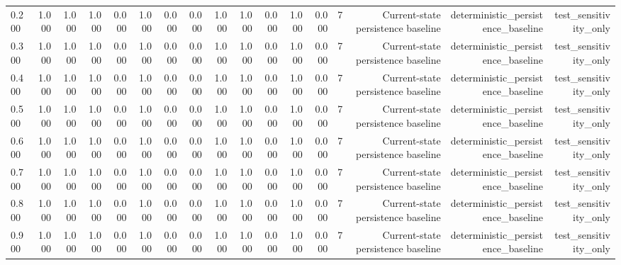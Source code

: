 \begin{tabular}{lrrrrrrrrrrrrrrrr}
0.200 & 1.000 & 1.000 & 1.000 & 0.000 & 1.000 & 0.000 & 0.000 & 1.000 & 1.000 & 0.000 & 1.000 & 0.000 & 7 & Current-state persistence baseline & deterministic\_persistence\_baseline & test\_sensitivity\_only \\
0.300 & 1.000 & 1.000 & 1.000 & 0.000 & 1.000 & 0.000 & 0.000 & 1.000 & 1.000 & 0.000 & 1.000 & 0.000 & 7 & Current-state persistence baseline & deterministic\_persistence\_baseline & test\_sensitivity\_only \\
0.400 & 1.000 & 1.000 & 1.000 & 0.000 & 1.000 & 0.000 & 0.000 & 1.000 & 1.000 & 0.000 & 1.000 & 0.000 & 7 & Current-state persistence baseline & deterministic\_persistence\_baseline & test\_sensitivity\_only \\
0.500 & 1.000 & 1.000 & 1.000 & 0.000 & 1.000 & 0.000 & 0.000 & 1.000 & 1.000 & 0.000 & 1.000 & 0.000 & 7 & Current-state persistence baseline & deterministic\_persistence\_baseline & test\_sensitivity\_only \\
0.600 & 1.000 & 1.000 & 1.000 & 0.000 & 1.000 & 0.000 & 0.000 & 1.000 & 1.000 & 0.000 & 1.000 & 0.000 & 7 & Current-state persistence baseline & deterministic\_persistence\_baseline & test\_sensitivity\_only \\
0.700 & 1.000 & 1.000 & 1.000 & 0.000 & 1.000 & 0.000 & 0.000 & 1.000 & 1.000 & 0.000 & 1.000 & 0.000 & 7 & Current-state persistence baseline & deterministic\_persistence\_baseline & test\_sensitivity\_only \\
0.800 & 1.000 & 1.000 & 1.000 & 0.000 & 1.000 & 0.000 & 0.000 & 1.000 & 1.000 & 0.000 & 1.000 & 0.000 & 7 & Current-state persistence baseline & deterministic\_persistence\_baseline & test\_sensitivity\_only \\
0.900 & 1.000 & 1.000 & 1.000 & 0.000 & 1.000 & 0.000 & 0.000 & 1.000 & 1.000 & 0.000 & 1.000 & 0.000 & 7 & Current-state persistence baseline & deterministic\_persistence\_baseline & test\_sensitivity\_only \\
\bottomrule
\end{tabular}